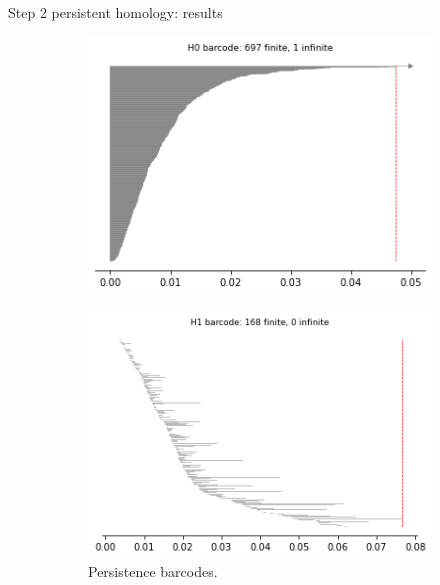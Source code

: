 \documentclass[xcolor={dvipsnames,svgnames}]{beamer}
\begin{document}
\begin{frame}{Step 2 persistent homology: results}
\begin{figure}[H]
\begin{subfigure}[b]{0.25\textwidth}
\end{subfigure}
\begin{subfigure}[b]{0.2\textwidth}
    \includegraphics[width=\textwidth]{figures/X5_H0_barcode.png}
    \caption{}
\end{subfigure}
\begin{subfigure}[b]{0.2\textwidth}
    \includegraphics[width=\textwidth]{figures/X5_H1_barcode.png}
        \caption{Persistence barcodes.}
\end{subfigure}
\begin{subfigure}[b]{0.2\textwidth}

\end{subfigure}
\end{figure}
\end{frame}
\end{document}
